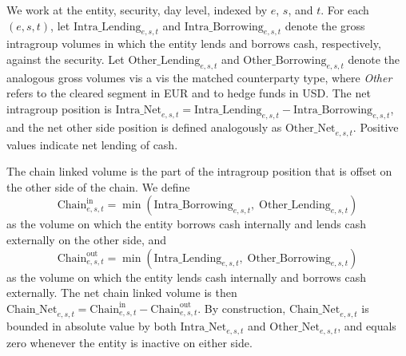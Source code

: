 \documentclass[english, 11pt, oneside, legal]{article}
\begin{document}
We work at the entity, security, day level, indexed by $e$, $s$, and $t$. For each $(e,s,t)$, let $\text{Intra\_Lending}_{e,s,t}$ and $\text{Intra\_Borrowing}_{e,s,t}$ denote the gross intragroup volumes in which the entity lends and borrows cash, respectively, against the security. Let $\text{Other\_Lending}_{e,s,t}$ and $\text{Other\_Borrowing}_{e,s,t}$ denote the analogous gross volumes vis a vis the matched counterparty type, where \emph{Other} refers to the cleared segment in EUR and to hedge funds in USD. The net intragroup position is $\text{Intra\_Net}_{e,s,t} = \text{Intra\_Lending}_{e,s,t} - \text{Intra\_Borrowing}_{e,s,t}$, and the net other side position is defined analogously as $\text{Other\_Net}_{e,s,t}$. Positive values indicate net lending of cash.

The chain linked volume is the part of the intragroup position that is offset on the other side of the chain. We define
\[
    \text{Chain}^{\text{in}}_{e,s,t} = \min\!\left(\text{Intra\_Borrowing}_{e,s,t},\;\text{Other\_Lending}_{e,s,t}\right)
\]
as the volume on which the entity borrows cash internally and lends cash externally on the other side, and
\[
    \text{Chain}^{\text{out}}_{e,s,t} = \min\!\left(\text{Intra\_Lending}_{e,s,t},\;\text{Other\_Borrowing}_{e,s,t}\right)
\]
as the volume on which the entity lends cash internally and borrows cash externally. The net chain linked volume is then $\text{Chain\_Net}_{e,s,t} = \text{Chain}^{\text{in}}_{e,s,t} - \text{Chain}^{\text{out}}_{e,s,t}$. By construction, $\text{Chain\_Net}_{e,s,t}$ is bounded in absolute value by both $\text{Intra\_Net}_{e,s,t}$ and $\text{Other\_Net}_{e,s,t}$, and equals zero whenever the entity is inactive on either side.
\end{document}
